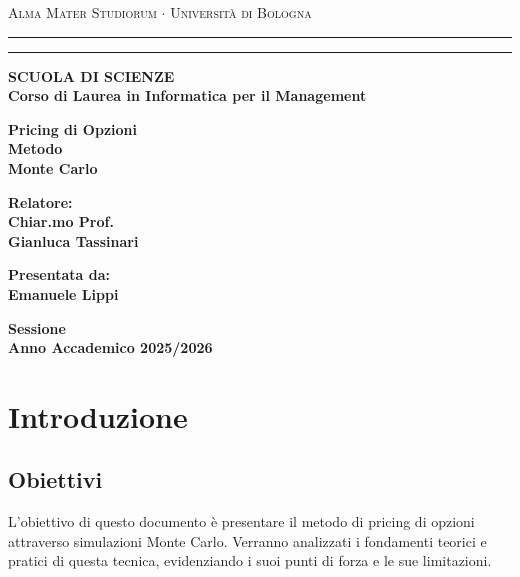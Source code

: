 \documentclass[12pt,a4paper]{report}
\begin{document}
\begin{titlepage}
\begin{center}
{{\Large{\textsc{Alma Mater Studiorum $\cdot$ Universit\`a di Bologna}}}} \rule[0.1cm]{15.8cm}{0.1mm}
\rule[0.5cm]{15.8cm}{0.6mm}
{\small{\bf SCUOLA DI SCIENZE\\
Corso di Laurea in Informatica per il Management }}
\end{center}
\vspace{15mm}
\begin{center}
{\LARGE{\bf Pricing di Opzioni}}\\
\vspace{3mm}
{\LARGE{\bf Metodo}}\\
\vspace{3mm}
{\LARGE{\bf Monte Carlo}}\\
\end{center}
\vspace{40mm}
\par
\noindent
\begin{minipage}[t]{0.47\textwidth}
{\large{\bf Relatore:\\
Chiar.mo Prof.\\
Gianluca Tassinari}}
\end{minipage}
\hfill
\begin{minipage}[t]{0.47\textwidth}\raggedleft
{\large{\bf Presentata da:\\%
Emanuele Lippi}}
\end{minipage}
\vspace{20mm}
\begin{center}
{\large{\bf Sessione\\
Anno Accademico 2025/2026}}
\end{center}
\end{titlepage}

\newpage
\tableofcontents

\newpage
\section{Introduzione}
\subsection{Obiettivi}
L'obiettivo di questo documento è presentare il metodo di pricing di opzioni attraverso simulazioni Monte Carlo. Verranno analizzati i fondamenti teorici e pratici di questa tecnica, evidenziando i suoi punti di forza e le sue limitazioni.
\end{document}
